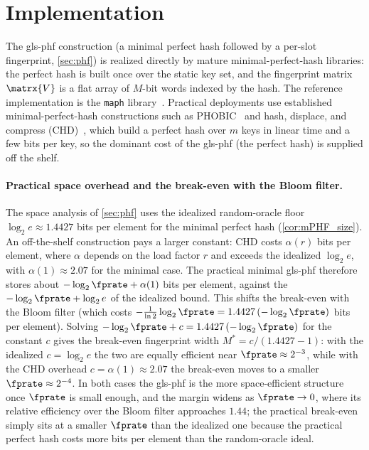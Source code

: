 \documentclass[ ../main.tex]{subfiles}
\begin{document}
\section{Implementation}
\label{sec:impl}
The \gls{gls-phf} construction (a minimal perfect hash followed by a per-slot
fingerprint, \cref{sec:phf}) is realized directly by mature minimal-perfect-hash
libraries: the perfect hash is built once over the static key set, and the
fingerprint matrix $\matrx{V}$ is a flat array of $M$-bit words indexed by the
hash. The reference implementation is the \texttt{maph} library~\cite{maph}.
Practical deployments use established minimal-perfect-hash constructions such as
PHOBIC~\cite{phobic} and hash, displace, and compress (CHD)~\cite{chd}, which
build a perfect hash over $m$ keys in linear time and a few bits per key, so the
dominant cost of the \gls{gls-phf} (the perfect hash) is supplied off the shelf.

\paragraph{Practical space overhead and the break-even with the Bloom filter.}
The space analysis of \cref{sec:phf} uses the idealized random-oracle floor
$\log_2 e \approx \num{1.4427}$ bits per element for the minimal perfect hash
(\cref{cor:mPHF_size}). An off-the-shelf construction pays a larger constant: CHD
costs $\alpha(r)$ bits per element, where $\alpha$ depends on the load factor $r$
and exceeds the idealized $\log_2 e$, with $\alpha(1) \approx \num{2.07}$ for the
minimal case. The practical minimal \gls{gls-phf} therefore stores about
$-\log_2 \fprate + \alpha(1)$ bits per element, against the $-\log_2 \fprate +
\log_2 e$ of the idealized bound. This shifts the break-even with the Bloom
filter (which costs $-\tfrac{1}{\ln 2}\log_2\fprate = \num{1.4427}\,(-\log_2
\fprate)$ bits per element). Solving $-\log_2\fprate + c = \num{1.4427}\,(-\log_2
\fprate)$ for the constant $c$ gives the break-even fingerprint width
$M^* = c/(\num{1.4427} - 1)$: with the idealized $c = \log_2 e$ the two are
equally efficient near $\fprate \approx 2^{-3}$, while with the CHD overhead
$c = \alpha(1) \approx \num{2.07}$ the break-even moves to a smaller
$\fprate \approx 2^{-4}$. In both cases the \gls{gls-phf} is the more
space-efficient structure once $\fprate$ is small enough, and the margin widens
as $\fprate \to 0$, where its relative efficiency over the Bloom filter
approaches $\num{1.44}$; the practical break-even simply sits at a smaller
$\fprate$ than the idealized one because the practical perfect hash costs more
bits per element than the random-oracle ideal.
\end{document}
